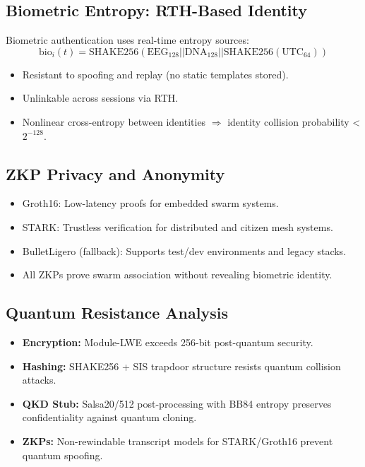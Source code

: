 \documentclass[12pt]{article}
\begin{document}
\subsection*{Biometric Entropy: RTH-Based Identity}

Biometric authentication uses real-time entropy sources:
\[
\text{bio}_i(t) = \text{SHAKE256}(\text{EEG}_{128} || \text{DNA}_{128} || \text{SHAKE256}(\text{UTC}_{64}))
\]
\begin{itemize}
    \item Resistant to spoofing and replay (no static templates stored).
    \item Unlinkable across sessions via RTH.
    \item Nonlinear cross-entropy between identities \( \Rightarrow \) identity collision probability < \( 2^{-128} \).
\end{itemize}

\subsection*{ZKP Privacy and Anonymity}

\begin{itemize}
    \item Groth16: Low-latency proofs for embedded swarm systems.
    \item STARK: Trustless verification for distributed and citizen mesh systems.
    \item BulletLigero (fallback): Supports test/dev environments and legacy stacks.
    \item All ZKPs prove swarm association without revealing biometric identity.
\end{itemize}

\subsection*{Quantum Resistance Analysis}

\begin{itemize}
    \item \textbf{Encryption:} Module-LWE exceeds 256-bit post-quantum security.
    \item \textbf{Hashing:} SHAKE256 + SIS trapdoor structure resists quantum collision attacks.
    \item \textbf{QKD Stub:} Salsa20/512 post-processing with BB84 entropy preserves confidentiality against quantum cloning.
    \item \textbf{ZKPs:} Non-rewindable transcript models for STARK/Groth16 prevent quantum spoofing.
\end{itemize}
\end{document}
